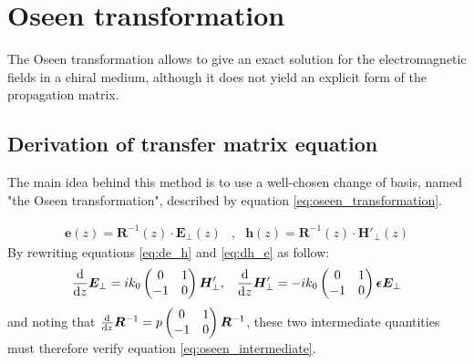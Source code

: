 \section{Oseen transformation}

The Oseen transformation allows to give an exact solution for the electromagnetic fields in a chiral medium, although it does not yield an explicit form of the propagation matrix.

\subsection{Derivation of transfer matrix equation}

The main idea behind this method is to use a well-chosen change of basis, named "the Oseen transformation", described by equation \ref{eq:oseen_transformation}.

\begin{eqnarray}
\bm{e}(z) = \bm{R}^{-1}(z)\cdot\bm{E}_\perp(z) &,& \bm{h}(z) = \bm{R}^{-1}(z)\cdot\bm{H}'_\perp(z) \label{eq:oseen_transformation}
\end{eqnarray}
%
By rewriting equations \ref{eq:de_h} and \ref{eq:dh_e} as follow:
\begin{eqnarray}
\dv{z}\bm{E}_\perp = ik_0\begin{pmatrix}
0 & 1\\-1 & 0
\end{pmatrix}\bm{H}'_\perp&,&
\dv{z}\bm{H}'_\perp = -ik_0\begin{pmatrix}
0 & 1\\-1 & 0
\end{pmatrix}\bm{\epsilon}\bm{E}_\perp
\end{eqnarray}
%
and noting that $\dv{z}\bm{R}^{-1} = p\begin{pmatrix}
0 & 1 \\ -1 & 0
\end{pmatrix} \bm{R}^{-1}$, these two intermediate quantities must therefore verify equation \ref{eq:oseen_intermediate}.

